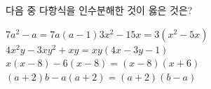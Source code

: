 다음 중 다항식을 인수분해한 것이 옳은 것은?
\begin{choicesv}{$7a^2-a=7a(a-1)$}{$3x^2-15x=3(x^2-5x)$}{$4x^2y-3xy^2+xy=xy(4x-3y-1)$}{$x(x-8)-6(x-8)=(x-8)(x+6)$}{$(a+2)b-a(a+2)=(a+2)(b-a)$}\end{choicesv}
